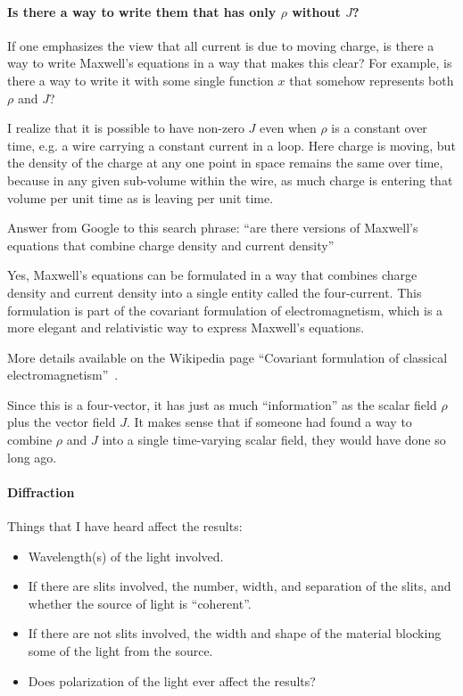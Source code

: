 \documentclass[a4paper]{article}
\theoremstyle{plain}
\theoremstyle{definition}
\begin{document}
\paragraph{Is there a way to write them that has only $\rho$ without $J$?}

If one emphasizes the view that all current is due to moving charge,
is there a way to write Maxwell's equations in a way that makes this
clear?  For example, is there a way to write it with some single
function $x$ that somehow represents both $\rho$ and $J$?

I realize that it is possible to have non-zero $J$ even when $\rho$ is
a constant over time, e.g. a wire carrying a constant current in a
loop.  Here charge is moving, but the density of the charge at any one
point in space remains the same over time, because in any given
sub-volume within the wire, as much charge is entering that volume per
unit time as is leaving per unit time.

Answer from Google to this search phrase: ``are there versions of
Maxwell's equations that combine charge density and current density''

Yes, Maxwell's equations can be formulated in a way that combines
charge density and current density into a single entity called the
four-current.  This formulation is part of the covariant formulation
of electromagnetism, which is a more elegant and relativistic way to
express Maxwell's equations.

More details available on the Wikipedia page ``Covariant formulation
of classical
electromagnetism''~\cite{CovariantFormulationOfClassicalElectromagnetism}.

Since this is a four-vector, it has just as much ``information'' as
the scalar field $\rho$ plus the vector field $J$.  It makes sense
that if someone had found a way to combine $\rho$ and $J$ into a
single time-varying scalar field, they would have done so long ago.


\paragraph{Diffraction}

Things that I have heard affect the results:

\begin{itemize}
  \item Wavelength(s) of the light involved.
  \item If there are slits involved, the number, width, and separation
    of the slits, and whether the source of light is ``coherent''.
  \item If there are not slits involved, the width and shape of the
    material blocking some of the light from the source.
  \item Does polarization of the light ever affect the results?
\end{itemize}
\end{document}
